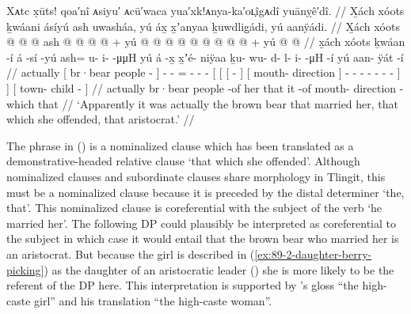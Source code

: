 \ex\label{ex:89-21-actually-brown-bear}%
%
\begingl
	\glpreamble	Xᴀtc x̣ūts! qoa′nî ᴀsiyu′ ᴀcū′waca yua′xk!ᴀnya-ka′oʟ̣îgᴀdî yuānỵê′dî. //
	\glpreamble	X̱ách xóots ḵwáani ásíyú ash uwasháa, yú áx̱ x̱ʼanyaa ḵuwdlig̱ádi, yú aanÿádi. //
	\gla	X̱ách
		{} xóots  @ {} {}
		 @ {} @ {}
		ash @  @ {} @ {} @ {} +
		{} yú {} {}  @ {} {}
			{}  @ {} {}
			 @ {} @ {} @ {} @ {} @ {} @ {} @ {} {} {} +
		{} yú  @ {} @ {} {} //
	\glb	x̱ách
		{} xóots ḵwáan -í {}
		á -sí -yú
		ash= u- i-  -μμH
		{} yú {} {} á -x̱ {}
			{} x̱ʼé- niÿaa {}
			ḵu- wu- d- l- i-  -μH -í {} {}
		{} yú aan- ÿát -í {} //
	\glc	actually
		{}[ br·bear people - {}]
		 - -
		= - -  -
		{}[  {}[ {}[  - {}]
			{}[ mouth- direction {}]
			- - - - -  - - {}] {}]
		{}[  town- child - {}] //
	\gld	actually
		{} br·bear people -of {}
		 {} {}
		her  {} {} {}
		{} that {} {} it -of {}
			{} mouth- direction {}
			 {} {} {} {} {} {} -which {} {}
		{} that  {} {} {} //
	\glft	‘Apparently it was actually the brown bear that married her, that which she offended, that aristocrat.’
		//
\endgl
\xe

The phrase  in (\lastx) is a nominalized clause which has been translated as a demonstrative-headed relative clause ‘that which she offended’.
Although nominalized clauses and subordinate clauses share morphology in Tlingit, this must be a nominalized clause because it is preceded by the distal determiner  ‘the, that’.
This nominalized clause is coreferential with the subject of the verb  ‘he married her’.
The following DP  could plausibly be interpreted as coreferential to the subject in which case it would entail that the brown bear who married her is an aristocrat.
But because the girl is described in (\ref{ex:89-2-daughter-berry-picking}) as the daughter of an aristocratic leader () she is more likely to be the referent of the DP  here.
This interpretation is supported by \citeauthor{swanton:1909}’s gloss “the high-caste girl” and his translation “the high-caste woman”.

